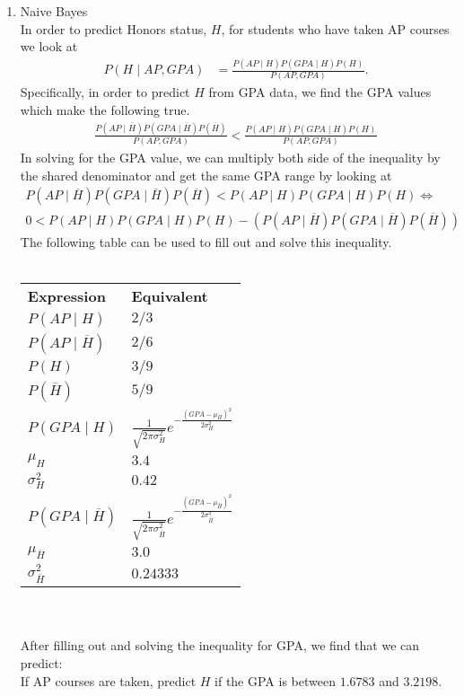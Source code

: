 \documentclass[12pt]{article}
\begin{document}
\begin{enumerate}
  	\item Naive Bayes \\
  		In order to predict Honors status, $H$, for students who have taken AP courses we look at 
  		\begin{align*}
  			P(H \mid AP, GPA) &= \frac{P(AP \mid H) P(GPA \mid H) P(H)}{P(AP,GPA)}.
  		\end{align*}
  		Specifically, in order to predict $H$ from GPA data, we find the GPA values which make the following true.
  		\begin{align*}
  		\frac{P(AP \mid \overline{H}) P(GPA \mid \overline{H}) P(\overline{H})}{P(AP,GPA)} < \frac{P(AP \mid H) P(GPA \mid H) P(H)}{P(AP,GPA)}
  		\end{align*} 
  		In solving for the GPA value, we can multiply both side of the inequality by the shared denominator and get the same GPA range by looking at 
  		\begin{align*}
  		P(AP \mid \overline{H}) P(GPA \mid \overline{H}) P(\overline{H}) < P(AP \mid H) P(GPA \mid H) P(H) \Longleftrightarrow \\
  		0 < P(AP \mid H) P(GPA \mid H) P(H) - \left( P(AP \mid \overline{H}) P(GPA \mid \overline{H}) P(\overline{H}) \right) 
  		\end{align*}
  		The following table can be used to fill out and solve this inequality.\\ \\
  		\begin{tabular}{l l}
  			\textbf{Expression} & \textbf{Equivalent} \\
  			$P(AP \mid H)$ & $2/3$ \\
  			$P(AP \mid \overline{H})$ & $2/6$ \\
  			$P(H)$ & $3/9$ \\
  			$P(\overline{H})$ & $5/9$ \\
  			$P(GPA \mid H)$ & $\frac{1}{\sqrt{2\pi\sigma_{H}^2}} e^{- \frac{(GPA - \mu_{H})^2}{2\sigma_{H}^2}} $ \\  	
  			$\mu_{H}$ & $3.4$ \\		
  			$\sigma_{H}^2$ & $0.42$ \\
  			$P(GPA \mid \overline{H})$ & $\frac{1}{\sqrt{2\pi\sigma_{\overline{H}}^2}} e^{- \frac{(GPA - \mu_{\overline{H}})^2}{2\sigma_{\overline{H}}^2}} $ \\
  			$\mu_{\overline{H}}$ & $3.0$ \\
  			$\sigma_{\overline{H}}^2$ & $0.24333$ \\
  		\end{tabular} \\ \\
  		After filling out and solving the inequality for GPA, we find that we can predict: \\
  		If AP courses are taken, predict $H$ if the GPA is between $1.6783$ and $3.2198$. \\ 
  		

\end{enumerate}
\end{document}
